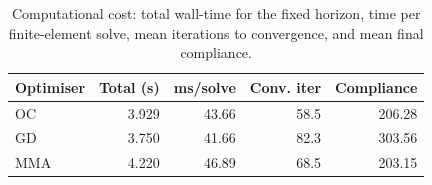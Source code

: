 \begin{table}[htbp]
\centering
\caption{Computational cost: total wall-time for the fixed horizon, time per finite-element solve, mean iterations to convergence, and mean final compliance.}
\label{tab:cost}
\begin{tabular}{lrrrr}
\toprule
Optimiser & Total (s) & ms/solve & Conv. iter & Compliance \\
\midrule
OC & 3.929 & 43.66 & 58.5 & 206.28 \\
GD & 3.750 & 41.66 & 82.3 & 303.56 \\
MMA & 4.220 & 46.89 & 68.5 & 203.15 \\
\bottomrule
\end{tabular}
\end{table}
